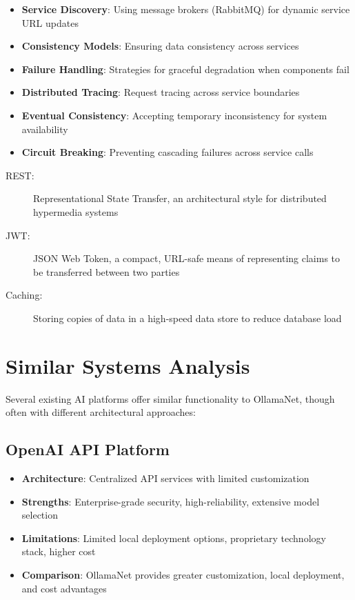 \begin{itemize}
    \item \textbf{Service Discovery}: Using message brokers (RabbitMQ) for dynamic service URL updates
    \item \textbf{Consistency Models}: Ensuring data consistency across services
    \item \textbf{Failure Handling}: Strategies for graceful degradation when components fail
    \item \textbf{Distributed Tracing}: Request tracing across service boundaries
    \item \textbf{Eventual Consistency}: Accepting temporary inconsistency for system availability
    \item \textbf{Circuit Breaking}: Preventing cascading failures across service calls
\end{itemize}

\begin{terminology}
\begin{description}
    \item[REST:] Representational State Transfer, an architectural style for distributed hypermedia systems
    \item[JWT:] JSON Web Token, a compact, URL-safe means of representing claims to be transferred between two parties
    \item[Caching:] Storing copies of data in a high-speed data store to reduce database load
\end{description}
\end{terminology}

\section{Similar Systems Analysis}

Several existing AI platforms offer similar functionality to OllamaNet, though often with different architectural approaches:

\subsection*{OpenAI API Platform}
\begin{itemize}
    \item \textbf{Architecture}: Centralized API services with limited customization
    \item \textbf{Strengths}: Enterprise-grade security, high-reliability, extensive model selection
    \item \textbf{Limitations}: Limited local deployment options, proprietary technology stack, higher cost
    \item \textbf{Comparison}: OllamaNet provides greater customization, local deployment, and cost advantages
\end{itemize}

